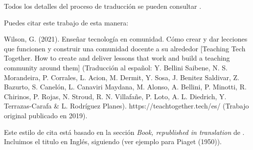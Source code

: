 Todos los detalles del proceso de traducción se pueden consultar
.


Puedes citar este trabajo de esta manera:

Wilson, G. (2021). Enseñar tecnología en comunidad. Cómo crear y dar lecciones que funcionen y construir una comunidad docente a su alrededor [Teaching Tech Together. How to create and deliver lessons that work and build a teaching community around them] (Traducción al español: Y. Bellini Saibene, N. S. Morandeira, P. Corrales, L. Acion, M. Dermit, Y. Sosa, J. Benitez Saldivar, Z. Bazurto, S. Canelón, L. Canaviri Maydana, M. Alonso, A. Bellini, P. Minotti, R. Chirinos, P. Rojas, N. Stroud, R. N. Villafañe, P. Loto, A. L. Diedrich, Y. Terrazas-Carafa & L. Rodríguez Planes). https://teachtogether.tech/es/ (Trabajo original publicado en 2019).

Este estilo de cita está basado en la sección \emph{Book, republished in translation} de . Incluimos el titulo en Inglés, siguiendo  (ver ejemplo para Piaget (1950)).
